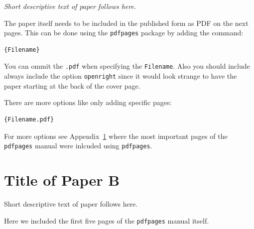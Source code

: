 \documentclass[11pt,openright]{book} %
\begin{document}
\emph{Short descriptive text of paper follows here.}\bigskip

The paper itself needs to be included in the published form as PDF on the next pages.
This can be done using the \texttt{pdfpages} package by adding the command:

\begin{verbatim}
{Filename}
\end{verbatim}

You can ommit the \texttt{.pdf} when specifying the \texttt{Filename}. Also you should include always include the option \texttt{openright} since it would look strange to have the paper starting at the back of the cover page.

There are more options like only adding specific pages:
\begin{verbatim}
{Filename.pdf}
\end{verbatim}

For more options see Appendix~\ref{paper-b} where the most important pages of the \texttt{pdfpages} manual were inlcuded using \texttt{pdfpages}.




\chapter[Short Title of Paper B]{Title of Paper B}
\label{paper-b}
Short descriptive text of paper follows here.

Here we included the first five pages of the \texttt{pdfpages} manual itself.


\end{document}
